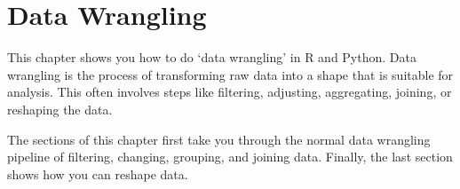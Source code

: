 \chapter{Data Wrangling}
\label{chap:datawrangling}
This chapter shows you how to do `data wrangling' in R and Python.
Data wrangling is the process of transforming raw data into a shape that is suitable for analysis.
This often involves steps like filtering, adjusting, aggregating, joining, or reshaping the data.

The sections of this chapter first take you through the normal data wrangling pipeline of
filtering, changing, grouping, and joining data. Finally, the last section shows how you can
reshape data.








